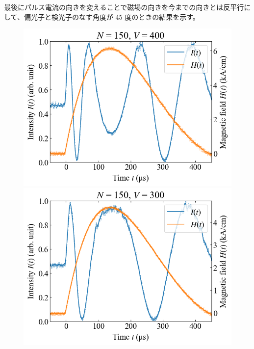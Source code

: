 \documentclass[9pt,dvipdfmx,a4paper]{jsarticle}
\begin{document}
最後にパルス電流の向きを変えることで磁場の向きを今までの向きとは反平行にして、偏光子と検光子のなす角度が 45 度のときの結果を示す。
\begin{figure}[H]
    \centering
    \begin{minipage}[t]{0.24\columnwidth}
        \centering
        \includegraphics[width = \columnwidth]{xt/22.png}
    \end{minipage}
    \hfill
    \begin{minipage}[t]{0.24\columnwidth}
        \centering
        \includegraphics[width = \columnwidth]{xt/23.png}
    \end{minipage}
    \hfill
    \begin{minipage}[t]{0.24\columnwidth}

\end{minipage}
\end{figure}
\end{document}
